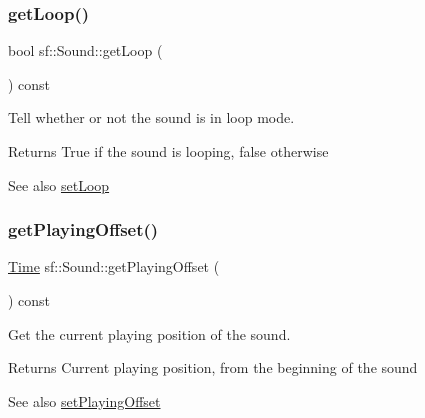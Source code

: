 \subsubsection{\texorpdfstring{getLoop()}{getLoop()}}
{\footnotesize\ttfamily bool sf\+::\+Sound\+::get\+Loop (\begin{DoxyParamCaption}{ }\end{DoxyParamCaption}) const}



Tell whether or not the sound is in loop mode. 

\begin{DoxyReturn}{Returns}
True if the sound is looping, false otherwise
\end{DoxyReturn}
\begin{DoxySeeAlso}{See also}
\mbox{\hyperlink{classsf_1_1_sound_af23ab4f78f975bbabac031102321612b}{set\+Loop}} \begin{DoxyVerb}\end{DoxyVerb}
 
\end{DoxySeeAlso}
\mbox{\label{classsf_1_1_sound_a559bc3aea581107bcb380fdbe523aa08}} 
\subsubsection{\texorpdfstring{getPlayingOffset()}{getPlayingOffset()}}
{\footnotesize\ttfamily \mbox{\hyperlink{classsf_1_1_time}{Time}} sf\+::\+Sound\+::get\+Playing\+Offset (\begin{DoxyParamCaption}{ }\end{DoxyParamCaption}) const}



Get the current playing position of the sound. 

\begin{DoxyReturn}{Returns}
Current playing position, from the beginning of the sound
\end{DoxyReturn}
\begin{DoxySeeAlso}{See also}
\mbox{\hyperlink{classsf_1_1_sound_ab905677846558042022dd6ab15cddff0}{set\+Playing\+Offset}} \begin{DoxyVerb}\end{DoxyVerb}
 
\end{DoxySeeAlso}
\mbox{\label{classsf_1_1_sound_a406fc363594a7718a53ebef49a870f51}} 
